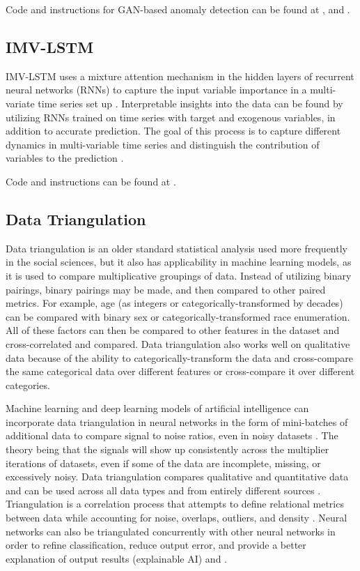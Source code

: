 \documentclass[conference]{IEEEtran}
\begin{document}
Code and instructions for GAN-based anomaly detection can be found at \cite{b65}, \cite{b66} and \cite{b67}.

\subsection{IMV-LSTM}
IMV-LSTM uses a mixture attention mechanism in the hidden layers of recurrent neural networks (RNNs) to capture the input variable importance in a multi-variate time series set up \cite{b68}.
Interpretable insights into the data can be found by utilizing RNNs trained on time series with target and exogenous variables, in addition to accurate prediction. The goal of this process is to capture different dynamics in multi-variable time series and distinguish the contribution of variables to the prediction \cite{b69}.

Code and instructions can be found at \cite{b70}.

\subsection{Data Triangulation}
Data triangulation is an older standard statistical analysis used more frequently in the social sciences, but it also has applicability in machine learning models, as it is used to compare multiplicative groupings of data. Instead of utilizing binary pairings, binary pairings may be made, and then compared to other paired metrics. For example, age (as integers or categorically-transformed by decades) can be compared with binary sex or categorically-transformed race enumeration. All of these factors can then be compared to other features in the dataset and cross-correlated and compared. Data triangulation also works well on qualitative data because of the ability to categorically-transform the data and cross-compare the same categorical data over different features or cross-compare it over different categories.

Machine learning and deep learning models of artificial intelligence can incorporate data triangulation in neural networks in the form of mini-batches of additional data to compare signal to noise ratios, even in noisy datasets \cite{b71}. The theory being that the signals will show up consistently across the multiplier iterations of datasets, even if some of the data are incomplete, missing, or excessively noisy. Data triangulation compares qualitative and quantitative data and can be used across all data types and from entirely different sources \cite{b71}. Triangulation is a correlation process that attempts to define relational metrics between data while accounting for noise, overlaps, outliers, and density \cite{b71}. Neural networks can also be triangulated concurrently with other neural networks in order to refine classification, reduce output error, and provide a better explanation of output results (explainable AI) \cite{b72} and \cite{b73}.
\end{document}
